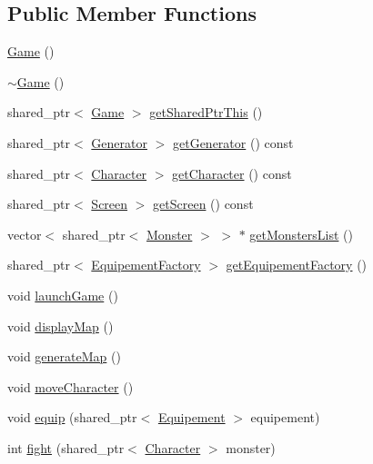 \subsection*{Public Member Functions}
\begin{DoxyCompactItemize}
\item 
\hyperlink{class_game_ad59df6562a58a614fda24622d3715b65}{Game} ()
\item 
\hyperlink{class_game_ae3d112ca6e0e55150d2fdbc704474530}{$\sim$\-Game} ()
\item 
shared\-\_\-ptr$<$ \hyperlink{class_game}{Game} $>$ \hyperlink{class_game_affaa9a4a7cc77fcc1fbd140e60f8907b}{get\-Shared\-Ptr\-This} ()
\item 
shared\-\_\-ptr$<$ \hyperlink{class_generator}{Generator} $>$ \hyperlink{class_game_a2a05d793c901ebdc60832d187b58d501}{get\-Generator} () const 
\item 
shared\-\_\-ptr$<$ \hyperlink{class_character}{Character} $>$ \hyperlink{class_game_acbabdf93244732c23a8fe1b482548fd5}{get\-Character} () const 
\item 
shared\-\_\-ptr$<$ \hyperlink{class_screen}{Screen} $>$ \hyperlink{class_game_a65eb691cddef147865580a8e0b76c579}{get\-Screen} () const 
\item 
vector$<$ shared\-\_\-ptr$<$ \hyperlink{class_monster}{Monster} $>$ $>$ $\ast$ \hyperlink{class_game_a68cfd228e261c182cfadf90463dc4727}{get\-Monsters\-List} ()
\item 
shared\-\_\-ptr$<$ \hyperlink{class_equipement_factory}{Equipement\-Factory} $>$ \hyperlink{class_game_a9e430bb75a7df9425b257d0018a97bb5}{get\-Equipement\-Factory} ()
\item 
void \hyperlink{class_game_aedb4cdc93c8ab85f2f7aff018ccd76ca}{launch\-Game} ()
\item 
void \hyperlink{class_game_a265b4a907a360afbb131334300968c9d}{display\-Map} ()
\item 
void \hyperlink{class_game_a124812c1a7b84f3aead51cb35a5146f8}{generate\-Map} ()
\item 
void \hyperlink{class_game_a8e92b564d2a037f0455b2f10ec9900f0}{move\-Character} ()
\item 
void \hyperlink{class_game_a9fd07ff4033e3d6fc2a9960e250581e6}{equip} (shared\-\_\-ptr$<$ \hyperlink{class_equipement}{Equipement} $>$ equipement)
\item 
int \hyperlink{class_game_a306fb013d1a8558d3053334dab286ea7}{fight} (shared\-\_\-ptr$<$ \hyperlink{class_character}{Character} $>$ monster)
\item 

\end{DoxyCompactItemize}
